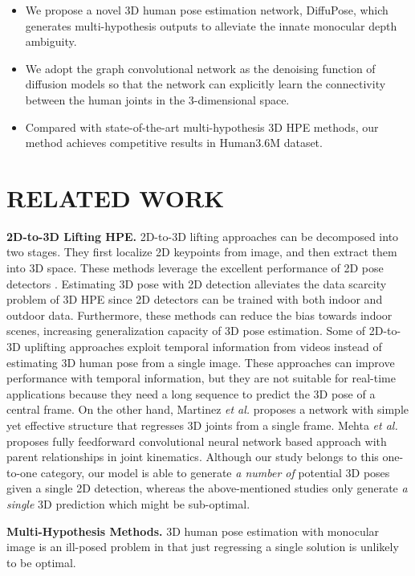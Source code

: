 \documentclass[letterpaper, 10 pt, conference]{ieeeconf}
\begin{document}
\begin{itemize}
    \item We propose a novel 3D human pose estimation network, DiffuPose, which generates multi-hypothesis outputs to alleviate the innate monocular depth ambiguity.
    \item We adopt the graph convolutional network as the denoising function of diffusion models so that the network can explicitly learn the connectivity between the human joints in the 3-dimensional space.
    \item Compared with state-of-the-art multi-hypothesis 3D HPE methods, our method achieves competitive results in Human3.6M dataset.
    
\end{itemize} \section{RELATED WORK}
\noindent\textbf{2D-to-3D Lifting HPE.}
2D-to-3D lifting approaches can be decomposed into two stages.
They first localize 2D keypoints from image, and then extract them into 3D space.
These methods leverage the excellent performance of 2D pose detectors \cite{cao2017realtime, chen2018cascaded, sun2019deep}.
Estimating 3D pose with 2D detection alleviates the data scarcity problem of 3D HPE since 2D detectors can be trained with both indoor and outdoor data.
Furthermore, these methods can reduce the bias towards indoor scenes, increasing generalization capacity of 3D pose estimation.
Some of 2D-to-3D uplifting approaches exploit temporal information \cite{pavllo20193d, zheng20213d, li2022mhformer} from videos instead of estimating 3D human pose from a single image.
These approaches can improve performance with temporal information, but they are not suitable for real-time applications because they need a long sequence to predict the 3D pose of a central frame.
On the other hand, Martinez \textit{et al.} \cite{martinez2017simple} proposes a network with simple yet effective structure that regresses 3D joints from a single frame.
Mehta \textit{et al.} \cite{mehta2017monocular} proposes fully feedforward convolutional neural network based approach with parent relationships in joint kinematics.
Although our study belongs to this one-to-one category, our model is able to generate \textit{a number of} potential 3D poses given a single 2D detection, whereas the above-mentioned studies only generate \textit{a single} 3D prediction which might be sub-optimal. 

\noindent\textbf{Multi-Hypothesis Methods.}
3D human pose estimation with monocular image is an ill-posed problem in that just regressing a single solution is unlikely to be optimal.
\end{document}
